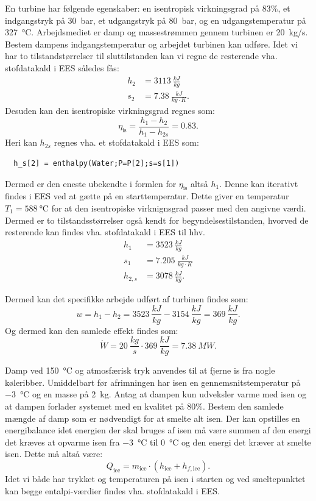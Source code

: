 \documentclass[a4paper]{article}
\begin{document}
En turbine har følgende egenskaber: en isentropisk virkningsgrad på 83\%, et indgangstryk på \qty{30}{bar}, et udgangstryk på \qty{80}{bar}, og en udgangstemperatur på \qty{327}{\celsius}. Arbejdsmediet er damp og massestrømmen gennem turbinen er \qty{20}{kg/s}. Bestem dampens indgangstemperatur og arbejdet turbinen kan udføre.
\bigbreak
Idet vi har to tilstandstørrelser til sluttilstanden kan vi regne de resterende vha. stofdatakald i EES således fås:
\begin{align*}
  h_2 &= \qty{3113}{\frac{kJ}{kg}}  \\
  s_2 &= \qty{7,38}{\frac{kJ}{kg\cdot K}} 
.\end{align*}
Desuden kan den isentropiske virkningsgrad regnes som:
\[ 
\eta_{\mathrm{is}} = \frac{h_1 - h_2}{h_1 - h_{2s}} = \num{0,83} 
.\]
Heri kan $h_{2s}$ regnes vha. et stofdatakald i EES som:
\begin{verbatim}  
  h_s[2] = enthalpy(Water;P=P[2];s=s[1])
\end{verbatim}
Dermed er den eneste ubekendte i formlen for $\eta_{\mathrm{is}}$ altså $h_1$. Denne kan iterativt findes i EES ved at gætte på en starttemperatur. Dette giver en temperatur $T_1 = \qty{588}{\celsius}$ for at den isentropiske virknignsgrad passer med den angivne værdi. Dermed er to tilstandsstørrelser også kendt for begyndelsestilstanden, hvorved de resterende kan findes vha. stofdatakald i EES til hhv.
\begin{align*}
  h_1 &= \qty{3523}{\frac{kJ}{kg}}  \\
  s_1 &= \qty{7,205}{\frac{kJ}{kg\cdot K}} \\
  h_{2,s} &= \qty{3078}{\frac{kJ}{kg}} 
.\end{align*}

Dermed kan det specifikke arbejde udført af turbinen findes som:
\[ 
w = h_1 - h_2 = \qty{3523}{\frac{kJ}{kg}} - \qty{3154}{\frac{kJ}{kg}} = \qty{369}{\frac{kJ}{kg}} 
.\]
Og dermed kan den samlede effekt findes som:
\[ 
\dot{W} = \qty{20}{\frac{kg}{s}} \cdot \qty{369}{\frac{kJ}{kg}} = \qty{7,38}{MW} 
.\]


Damp ved \qty{150}{\celsius} og atmosfærisk tryk anvendes til at fjerne is fra nogle køleribber. Umiddelbart før afrimningen har isen en gennemsnitstemperatur på \qty{-3}{\celsius} og en masse på \qty{2}{kg}. Antag at dampen kun udveksler varme med isen og at dampen forlader systemet med en kvalitet på 80\%. Bestem den samlede mængde af damp som er nødvendigt for at smelte alt isen.
\bigbreak
Der kan opstilles en energibalance idet energien der skal bruges af isen må være summen af den energi det kræves at opvarme isen fra \qty{-3}{\celsius}  til \qty{0}{\celsius} og den energi det kræver at smelte isen. Dette må altså være:
\[ 
  Q_{\mathrm{ice}} = m_{\mathrm{ice}}\cdot \left( h_{\mathrm{ice}} + h_{f, \mathrm{ice}}\right)
.\]
Idet vi både har trykket og temperaturen på isen i starten og ved smeltepunktet kan begge entalpi-værdier findes vha. stofdatakald i EES.
\end{document}
